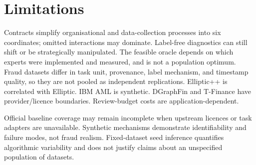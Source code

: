 \section{Limitations}

Contracts simplify organisational and data-collection processes into six
coordinates; omitted interactions may dominate. Label-free diagnostics can
still shift or be strategically manipulated. The feasible oracle depends on
which experts were implemented and measured, and is not a population optimum.
Fraud datasets differ in task unit, provenance, label mechanism, and timestamp
quality, so they are not pooled as independent replications. Elliptic++ is
correlated with Elliptic. IBM AML is synthetic. DGraphFin and T-Finance have
provider/licence boundaries. Review-budget costs are application-dependent.

Official baseline coverage may remain incomplete when upstream licences or
task adapters are unavailable. Synthetic mechanisms demonstrate identifiability
and failure modes, not fraud realism. Fixed-dataset seed inference quantifies
algorithmic variability and does not justify claims about an unspecified
population of datasets.
